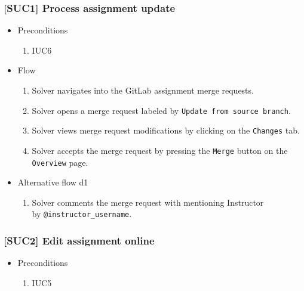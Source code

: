\subsubsection{{[}SUC1{]} Process assignment update}

\begin{itemize}
\item
  {Preconditions}
    \begin{enumerate}
    \item
      {IUC6}
    \end{enumerate}
\end{itemize}

\begin{itemize}
\item
  {Flow}
    \begin{enumerate}
    \item
      {Solver navigates into the GitLab assignment merge requests.}
    \item
      {Solver opens a merge request labeled by \texttt{Update from source branch}.}
    \item
      {Solver views merge request modifications by clicking on the \texttt{Changes} tab.}
    \item
      {Solver accepts the merge request by pressing the \texttt{Merge} button on the \texttt{Overview} page.}
    \end{enumerate}
\item
  {Alternative flow d1}
    \begin{enumerate}
    \item
      {Solver comments the merge request with mentioning Instructor \\ by \texttt{@instructor\_username}.}
    \end{enumerate}
\end{itemize}

\subsubsection{{[}SUC2{]} Edit assignment online}

\begin{itemize}
\item
  {Preconditions}
    \begin{enumerate}
    \item
      {IUC5}
    \end{enumerate}
\end{itemize}

